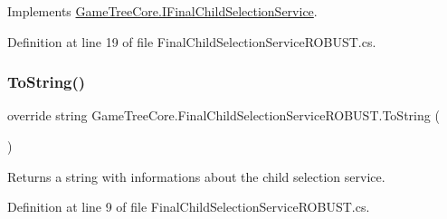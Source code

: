 Implements \mbox{\hyperlink{interface_game_tree_core_1_1_i_final_child_selection_service}{Game\+Tree\+Core.\+I\+Final\+Child\+Selection\+Service}}.



Definition at line 19 of file Final\+Child\+Selection\+Service\+R\+O\+B\+U\+S\+T.\+cs.

\mbox{\label{class_game_tree_core_1_1_final_child_selection_service_r_o_b_u_s_t_abf32995059eff3ba39b40d3dfa1ed512}} 
\subsubsection{\texorpdfstring{To\+String()}{ToString()}}
{\footnotesize\ttfamily override string Game\+Tree\+Core.\+Final\+Child\+Selection\+Service\+R\+O\+B\+U\+S\+T.\+To\+String (\begin{DoxyParamCaption}{ }\end{DoxyParamCaption})}



Returns a string with informations about the child selection service. 



Definition at line 9 of file Final\+Child\+Selection\+Service\+R\+O\+B\+U\+S\+T.\+cs.

